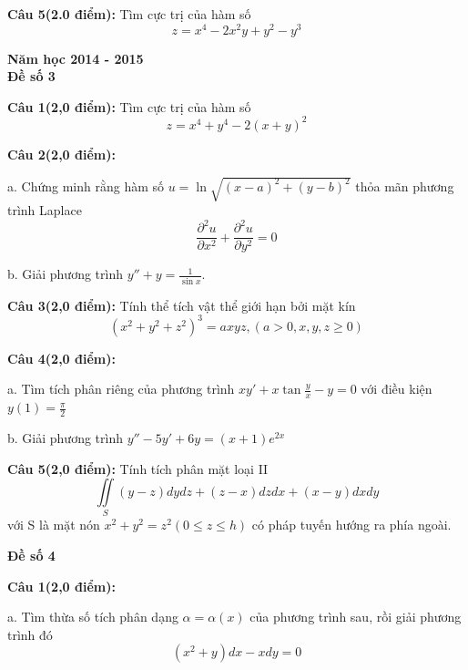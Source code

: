 \documentclass[14pt, a4paper]{article}
\begin{document}
	\textbf{Câu 5(2.0 điểm):} Tìm cực trị của hàm số \[z = {x^4} - 2{x^2}y + {y^2} - {y^3}\]
	
	\pagebreak
	
	\begin{center}
		{\LARGE \textbf{Năm học 2014 - 2015}}\\
		\vspace{0.5cm}
		{\large \textbf{Đề số 3}}
	\end{center}

	\textbf{Câu 1(2,0 điểm):} Tìm cực trị của hàm số \[z = {x^4} + {y^4} - 2{(x + y)^2}\]
	
	\vspace{0.5cm}
	
	\textbf{Câu 2(2,0 điểm):}
	
	a. Chứng minh rằng hàm số $ u = \ln \sqrt {{{(x - a)}^2} + {{(y - b)}^2}}  $ thỏa mãn phương trình Laplace $$ \frac{{{\partial ^2}u}}{{\partial {x^2}}} + \frac{{{\partial ^2}u}}{{\partial {y^2}}} = 0 $$
	
	b. Giải phương trình $ y'' + y = \frac{1}{{\sin x}} $.
	
	\vspace{0.5cm}
	
	\textbf{Câu 3(2,0 điểm):} Tính thể tích vật thể giới hạn bởi mặt kín\[{({x^2} + {y^2} + {z^2})^3} = axyz,(a > 0,x,y,z \geqslant 0)\]
	
	\vspace{0.5cm}
	
	\textbf{Câu 4(2,0 điểm):}
	
	a. Tìm tích phân riêng của phương trình $ xy' + x\tan \frac{y}{x} - y = 0 $ với điều kiện $ y(1) = \frac{\pi }{2} $
	
	b. Giải phương trình $ y'' - 5y' + 6y = (x + 1){e^{2x}} $
	
	\vspace{0.5cm}
	
	\textbf{Câu 5(2,0 điểm):} Tính tích phân mặt loại II \[\iint\limits_S {(y - z)dydz + (z - x)dzdx + (x - y)dxdy}\] với S là mặt nón $ {x^2} + {y^2} = {z^2}(0 \leqslant z \leqslant h) $ có pháp tuyến hướng ra phía ngoài.
	
	\pagebreak
	
	\begin{center}
		{\large \textbf{Đề số 4}}
	\end{center}
	
	\textbf{Câu 1(2,0 điểm):}
	
	a. Tìm thừa số tích phân dạng $ \alpha  = \alpha (x) $ của phương trình sau, rồi giải phương trình đó \[({x^2} + y)dx - xdy = 0\]
	
\end{document}
